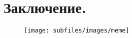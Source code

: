 \section{Заключение.}
\begin{figure}[H]
    \centering
    \texttt{[image: subfiles/images/meme]}
\end{figure}

